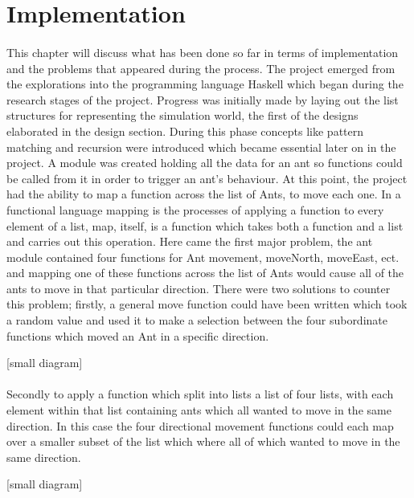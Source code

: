 \documentclass[main.tex]{subfiles}
\begin{document}

\section{Implementation}

\paragraph{}This chapter will discuss what has been done so far in terms of implementation and the problems that appeared during the process. The project emerged from the explorations into the programming language Haskell which began during the research stages of the project. Progress was initially made by laying out the list structures for representing the simulation world, the first of the designs elaborated in the design section. During this phase concepts like pattern matching and recursion were introduced which became essential later on in the project. A module was created holding all the data for an ant so functions could be called from it in order to trigger an ant's behaviour. At this point, the project had the ability to map a function across the list of Ants, to move each one. In a functional language mapping is the processes of applying a function to every element of a list, map, itself, is a function which takes both a function and a list and carries out this operation. Here came the first major problem, the ant module contained four functions for Ant movement, moveNorth, moveEast, ect. and mapping one of these functions across the list of Ants would cause all of the ants to move in that particular direction. There were two solutions to counter this problem; firstly, a general move function could have been written which took a random value and used it to make a selection between the four subordinate functions which moved an Ant in a specific direction. 

[small diagram]

\paragraph{}Secondly to apply a function which split into lists a list of four lists, with each element within that list containing ants which all wanted to move in the same direction. In this case the four directional movement functions could each map over a smaller subset of the list which where all of which wanted to move in the same direction. 

[small diagram] 
\end{document}
